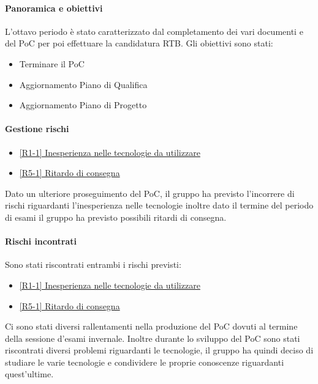 \documentclass[a4paper,12pt]{article}
\begin{document}
            \paragraph{Panoramica e obiettivi}
            L'ottavo periodo è stato caratterizzato dal completamento dei vari documenti e del PoC per poi effettuare la candidatura RTB. Gli obiettivi sono stati:
            \begin{itemize}
                \item Terminare il PoC
                \item Aggiornamento Piano di Qualifica
                \item Aggiornamento Piano di Progetto
            \end{itemize}
            
            \paragraph{Gestione rischi}
                \begin{itemize}
                \item\hyperref[tab:r1]{[R1-1] Inesperienza nelle tecnologie da utilizzare}
                \item\hyperref[tab:r5]{[R5-1] Ritardo di consegna}
                \end{itemize}
                Dato un ulteriore proseguimento del PoC, il gruppo ha previsto l'incorrere di rischi riguardanti l'inesperienza nelle tecnologie inoltre dato il termine del periodo di esami il gruppo ha previsto possibili ritardi di consegna.
    
                \paragraph*{Rischi incontrati}
                Sono stati riscontrati entrambi i rischi previsti:
                \begin{itemize}
                    \item \hyperref[tab:r1]{[R1-1] Inesperienza nelle tecnologie da utilizzare}
                    \item \hyperref[tab:r5]{[R5-1] Ritardo di consegna}
                \end{itemize}
                Ci sono stati diversi rallentamenti nella produzione del PoC dovuti al termine della sessione d'esami invernale. Inoltre durante lo sviluppo del PoC sono stati riscontrati diversi problemi riguardanti le tecnologie, il gruppo ha quindi deciso di studiare le varie tecnologie e condividere le proprie conoscenze riguardanti quest'ultime.
                
\end{document}
